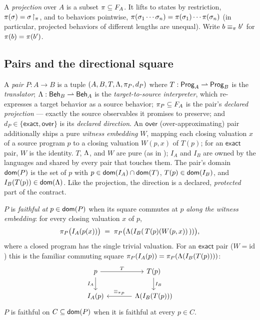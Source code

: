 \begin{definition}[Projection]
\label{def:projection}
A \emph{projection} over $A$ is a subset $\pi \subseteq F_A$. It lifts
to states by restriction, $\pi(\sigma) = \sigma\!\restriction_{\pi}$,
and to behaviors pointwise,
$\pi(\sigma_1 \cdots \sigma_n) = \pi(\sigma_1) \cdots \pi(\sigma_n)$
(in particular, projected behaviors of different lengths are unequal).
Write $b \equiv_{\pi} b'$ for $\pi(b) = \pi(b')$.
\end{definition}

\subsection{Pairs and the directional square}
\label{sec:pairs}

\begin{definition}[Pair]
\label{def:pair}
A \emph{pair} $P : A \to B$ is a tuple
$(A, B, T, \Lambda, \pi_P, d_P)$ where
$T : \mathsf{Prog}_{A} \rightharpoonup \mathsf{Prog}_{B}$ is the \emph{translator};
$\Lambda : \mathsf{Beh}_{B} \rightharpoonup \mathsf{Beh}_{A}$ is the
\emph{target-to-source interpreter}, which re-expresses a target behavior
as a source behavior; $\pi_P \subseteq F_A$ is the pair's
\emph{declared projection} --- exactly the source observables it promises
to preserve; and $d_P \in \{\mathsf{exact}, \mathsf{over}\}$ is its
\emph{declared direction}. An $\mathsf{over}$ (over-approximating) pair
additionally ships a pure \emph{witness embedding} $W$, mapping each
closing valuation $x$ of a source program $p$ to a closing valuation
$W(p,x)$ of $T(p)$; for an $\mathsf{exact}$ pair, $W$ is the identity.
$T$, $\Lambda$, and $W$ are pure (as in );
$I_A$ and $I_B$ are owned by the languages and shared by every pair that
touches them. The pair's domain $\mathsf{dom}(P)$ is the set of $p$ with
$p \in \mathsf{dom}(I_A) \cap \mathsf{dom}(T)$, $T(p) \in \mathsf{dom}(I_B)$, and
$I_B(T(p)) \in \mathsf{dom}(\Lambda)$. Like the projection, the direction is a
declared, \emph{protected} part of the contract.
\end{definition}

\begin{definition}
\label{def:faithful}
\label{def:lax}
$P$ is \emph{faithful at} $p \in \mathsf{dom}(P)$ when its square commutes at
$p$ \emph{along the witness embedding}: for every closing valuation $x$
of $p$,
\[
\pi_P\bigl(I_A(p(x))\bigr) \;=\;
\pi_P\bigl(\Lambda(I_B(\,T(p)(W(p,x))\,))\bigr),
\]
where a closed program has the single trivial valuation. For an
$\mathsf{exact}$ pair ($W = \mathrm{id}$) this is the familiar
commuting square $\pi_P(I_A(p)) = \pi_P(\Lambda(I_B(T(p))))$:
\[
\begin{tikzcd}[column sep=large]
p \arrow[r, "T"] \arrow[d, "I_A"'] & T(p) \arrow[d, "I_B"] \\
I_A(p) & \carry(I_B(T(p))) \arrow[l, "\eqproj{\proj_P}"']
\end{tikzcd}
\]
$P$ is faithful on $C \subseteq \mathsf{dom}(P)$ when it is faithful at every
$p \in C$.
\end{definition}

